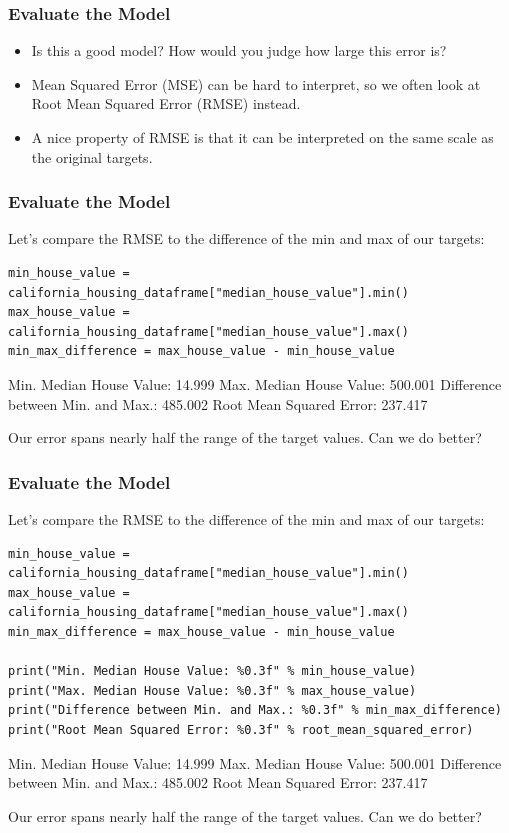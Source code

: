 \begin{frame}[fragile]\frametitle{Evaluate the Model}
\begin{itemize}
\item Is this a good model? How would you judge how large this error is?
\item Mean Squared Error (MSE) can be hard to interpret, so we often look at Root Mean Squared Error (RMSE) instead. 
\item A nice property of RMSE is that it can be interpreted on the same scale as the original targets.
\end{itemize}
\end{frame}

\begin{frame}[fragile]\frametitle{Evaluate the Model}
Let's compare the RMSE to the difference of the min and max of our targets:
\begin{lstlisting}
min_house_value = california_housing_dataframe["median_house_value"].min()
max_house_value = california_housing_dataframe["median_house_value"].max()
min_max_difference = max_house_value - min_house_value

\end{lstlisting}
Min. Median House Value: 14.999
Max. Median House Value: 500.001
Difference between Min. and Max.: 485.002
Root Mean Squared Error: 237.417

Our error spans nearly half the range of the target values. Can we do better?
\end{frame}

\begin{frame}[fragile]\frametitle{Evaluate the Model}
Let's compare the RMSE to the difference of the min and max of our targets:
\begin{lstlisting}
min_house_value = california_housing_dataframe["median_house_value"].min()
max_house_value = california_housing_dataframe["median_house_value"].max()
min_max_difference = max_house_value - min_house_value

print("Min. Median House Value: %0.3f" % min_house_value)
print("Max. Median House Value: %0.3f" % max_house_value)
print("Difference between Min. and Max.: %0.3f" % min_max_difference)
print("Root Mean Squared Error: %0.3f" % root_mean_squared_error)
\end{lstlisting}
Min. Median House Value: 14.999
Max. Median House Value: 500.001
Difference between Min. and Max.: 485.002
Root Mean Squared Error: 237.417

Our error spans nearly half the range of the target values. Can we do better?
\end{frame}


